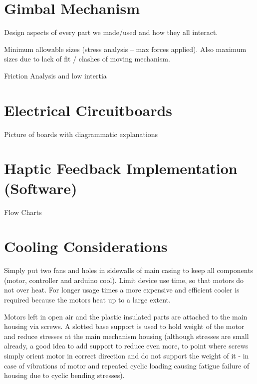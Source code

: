 \section{Gimbal Mechanism}
\label{secgimbal_mechanism}

Design aspects of every part we made/used and how they all interact.

Minimum allowable sizes (stress analysis – max forces applied). Also maximum sizes due to lack of fit / clashes of moving mechanism.

Friction Analysis and low intertia


\section{Electrical Circuitboards}
\label{secelectrical_circuitboards}

Picture of boards with diagrammatic explanations


\section{Haptic Feedback Implementation (Software)}
\label{sechaptic_feedback_implementation_}

Flow Charts


\section{Cooling Considerations}
\label{seccooling_considerations}
Simply put two fans and holes in sidewalls of main casing to keep all components (motor, controller and arduino cool).
Limit device use time, so that motors do not over heat. For longer usage times a more expensive and efficient cooler is required because the motors heat up to a large extent.

Motors left in open air and the plastic insulated parts are attached to the main housing via screws. A slotted base support is used to hold weight of the motor and reduce stresses at the main mechanism housing (although stresses are small already, a good idea to add support to reduce even more, to point where screws simply orient motor in correct direction and do not support the weight of it - in case of vibrations of motor and repeated cyclic loading causing fatigue failure of housing due to cyclic bending stresses).

